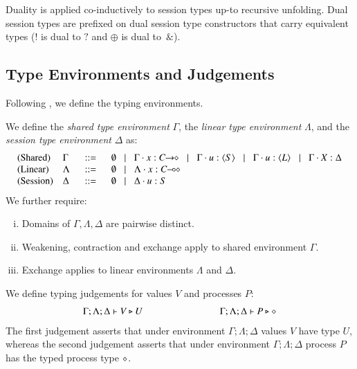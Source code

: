 %
Duality is applied co-inductively to session types
up-to recursive unfolding.
Dual session types are prefixed
on dual session type constructors
that carry equivalent types ($!$ is dual to $?$ and $\oplus$ is dual to~$\&$).


\subsection{Type Environments and Judgements}
Following
\cite{tlca07,MostrousY15}, we define the typing environments.
%
\begin{definition}\myrm\label{def:typeenv}
	We define the {\em shared type environment} $\Gamma$,
	the {\em linear type environment} $\Lambda$, and
	the {\em session type environment} $\Delta$ as:
	\[
	\begin{array}{llcl}
		\text{(Shared)}		& \Gamma  & \bnfis &	\emptyset \bnfbar \Gamma \cat x: \shot{C} \bnfbar \Gamma \cat u: \chtype{S} \bnfbar
								\Gamma \cat u: \chtype{L} \bnfbar \Gamma \cat \varp{X}: \Delta
		\\
		\text{(Linear)}		& \Lambda & \bnfis &	\emptyset \bnfbar \Lambda \cat x: \lhot{C}
		\\
		\text{(Session)}	& \Delta  & \bnfis &	\emptyset \bnfbar \Delta \cat u:S
	\end{array}
	\]
	We further require:
	\begin{enumerate}[i.]
		\item	Domains of $\Gamma, \Lambda, \Delta$ are pairwise distinct.
		\item	Weakening, contraction and exchange apply to shared environment $\Gamma$.
		\item	Exchange applies to linear environments $\Lambda$ and $\Delta$. 
	\end{enumerate}
\end{definition}
%
\noi We define typing judgements for values $V$
and processes $P$:
%
\[	\begin{array}{c}
		\Gamma; \Lambda; \Delta \vdash V \triangleright U \qquad \qquad \qquad \qquad \Gamma; \Lambda; \Delta \vdash P \triangleright \diamond
	\end{array}
\]
%
\noi The first judgement asserts that under environment $\Gamma; \Lambda; \Delta$
values $V$ have type $U$,
whereas the second judgement asserts that under environment $\Gamma; \Lambda; \Delta$
process $P$ has the typed process type $\diamond$.


